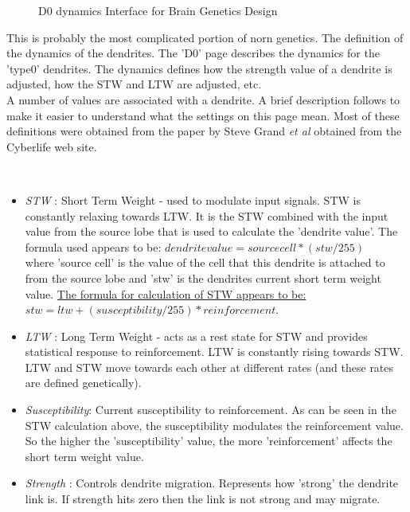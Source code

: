 \documentclass[11pt,twoside,a4paper]{article}
\begin{document}
\begin{minipage}{0.4\linewidth}
\begin{figure}[H]
	\centerline {} %
	\caption{D0 dynamics Interface for Brain Genetics Design}
	\label{fig:brain_d0dynamics}
\end{figure}
\end{minipage}
\begin{minipage}{0.1\linewidth}\end{minipage}
\begin{minipage}{0.5\linewidth}
This is probably the most complicated portion of norn genetics. The definition of the dynamics of the dendrites. The 'D0' page describes the dynamics for the 'type0' dendrites. The dynamics defines how the strength value of a dendrite is adjusted, how the STW and LTW are adjusted, etc.~\\

A number of values are associated with a dendrite. A brief description follows to make it easier to understand what the settings on this page mean. Most of these definitions were obtained from the paper by Steve Grand \textit{et al} obtained from the Cyberlife web site.
\end{minipage}~\\

\begin{itemize}
	\item[] \emph{STW} : Short Term Weight - used to modulate input signals. STW is constantly relaxing towards LTW. It is the STW combined with the input value from the source lobe that is used to calculate the 'dendrite value'. The formula used appears to be: $dendrite value = source cell * ( stw / 255 )$~\\
where 'source cell' is the value of the cell that this dendrite is attached to from the source lobe and 'stw' is the dendrites current short term weight value. \underline{The formula for calculation of STW appears to be: } $stw = ltw + ( susceptibility / 255 ) * reinforcement$. 
	\item[] \emph{LTW} : Long Term Weight - acts as a rest state for STW and provides statistical response to reinforcement. LTW is constantly rising towards STW. LTW and STW move towards each other at different rates (and these rates are defined genetically).
	\item[] \emph{Susceptibility}: Current susceptibility to reinforcement. As can be seen in the STW calculation above, the susceptibility modulates the reinforcement value. So the higher the 'susceptibility' value, the more 'reinforcement' affects the short term weight value. 
	\item[] \emph{Strength} : Controls dendrite migration. Represents how 'strong' the dendrite link is. If strength hits zero then the link is not strong and may migrate.
\end{itemize}
\clearpage
\end{document}
